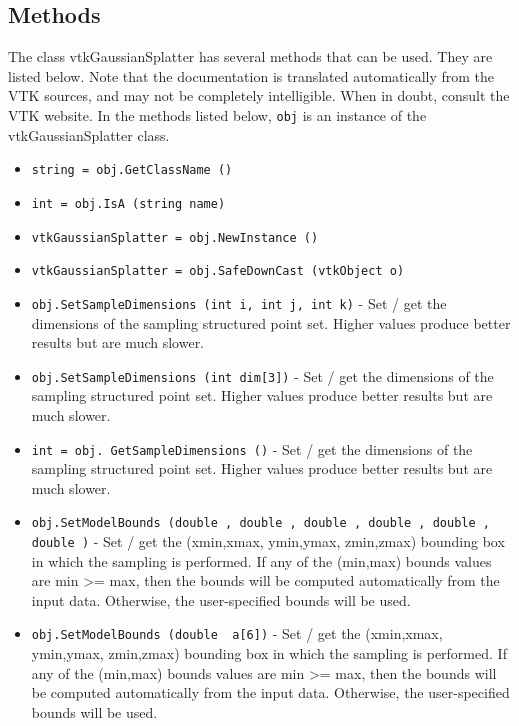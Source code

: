 \subsection{Methods}

The class vtkGaussianSplatter has several methods that can be used.
  They are listed below.
Note that the documentation is translated automatically from the VTK sources,
and may not be completely intelligible.  When in doubt, consult the VTK website.
In the methods listed below, \verb|obj| is an instance of the vtkGaussianSplatter class.
\begin{itemize}
\item  \verb|string = obj.GetClassName ()|

\item  \verb|int = obj.IsA (string name)|

\item  \verb|vtkGaussianSplatter = obj.NewInstance ()|

\item  \verb|vtkGaussianSplatter = obj.SafeDownCast (vtkObject o)|

\item  \verb|obj.SetSampleDimensions (int i, int j, int k)| -  Set / get the dimensions of the sampling structured point set. Higher
 values produce better results but are much slower.

\item  \verb|obj.SetSampleDimensions (int dim[3])| -  Set / get the dimensions of the sampling structured point set. Higher
 values produce better results but are much slower.

\item  \verb|int = obj. GetSampleDimensions ()| -  Set / get the dimensions of the sampling structured point set. Higher
 values produce better results but are much slower.

\item  \verb|obj.SetModelBounds (double , double , double , double , double , double )| -  Set / get the (xmin,xmax, ymin,ymax, zmin,zmax) bounding box in which
 the sampling is performed. If any of the (min,max) bounds values are
 min >= max, then the bounds will be computed automatically from the input
 data. Otherwise, the user-specified bounds will be used.

\item  \verb|obj.SetModelBounds (double  a[6])| -  Set / get the (xmin,xmax, ymin,ymax, zmin,zmax) bounding box in which
 the sampling is performed. If any of the (min,max) bounds values are
 min >= max, then the bounds will be computed automatically from the input
 data. Otherwise, the user-specified bounds will be used.


\end{itemize}
